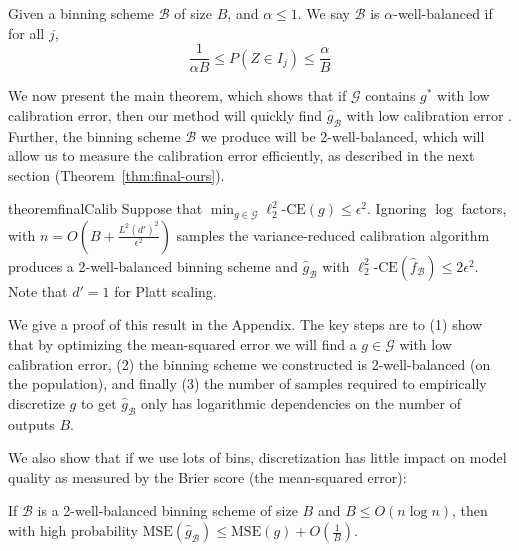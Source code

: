 \begin{definition}
Given a binning scheme $\mathcal{B}$ of size $B$, and $\alpha \leq 1$. We say $\mathcal{B}$ is $\alpha$-well-balanced if for all $j$,
\[ \frac{1}{\alpha B} \leq P(Z \in I_j) \leq \frac{\alpha}{B}\]
\end{definition}

We now present the main theorem, which shows that if $\mathcal{G}$ contains $g^*$ with low calibration error, then our method will quickly find $\hat{g}_{\mathcal{B}}$ with low calibration error . Further, the binning scheme $\mathcal{B}$ we produce will be 2-well-balanced, which will allow us to measure the calibration error efficiently, as described in the next section (Theorem~\ref{thm:final-ours}).

\begin{restatable}{theorem}{finalCalib}
\label{thm:final-calib}
Suppose that $\min_{g \in \mathcal{G}}\ell_2^2\mbox{-CE}(g) \leq \epsilon^2$.
  Ignoring $\log$ factors, with $n = O(B + \frac{L^2 (d')^2}{\epsilon^2})$  samples the variance-reduced calibration algorithm produces a 2-well-balanced binning scheme and $\hat{g}_{\mathcal{B}}$ with $\ell_2^2\mbox{-CE}(\hat{f}_{\mathcal{B}}) \leq 2 \epsilon^2$. Note that $d' = 1$ for Platt scaling.
\end{restatable}

We give a proof of this result in the Appendix. The key steps are to (1) show that by optimizing the mean-squared error we will find a $g \in \mathcal{G}$ with low calibration error, (2) the binning scheme we constructed is 2-well-balanced (on the population), and finally (3) the number of samples required to empirically discretize $g$ to get $\hat{g}_{\mathcal{B}}$ only has logarithmic dependencies on the number of outputs $B$.

We also show that if we use lots of bins, discretization has little impact on model quality as measured by the Brier score (the mean-squared error):

\begin{theorem}
\label{thm:sharpness-bound}
If $\mathcal{B}$ is a 2-well-balanced binning scheme of size $B$ and $B \leq O(n\log{n})$, then with high probability $\mbox{MSE}(\hat{g}_{\mathcal{B}}) \leq \mbox{MSE}(g) + O(\frac{1}{B})$.
\end{theorem}

